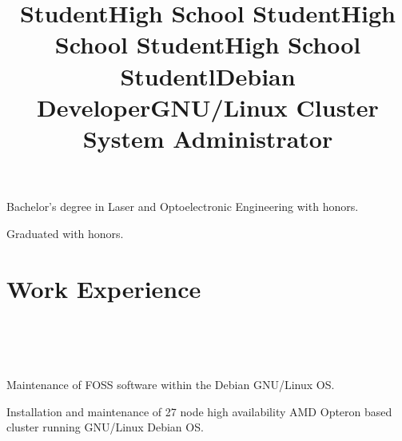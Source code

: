 \documentclass[10pt,overlapped,line]{res}
\begin{document}
\begin{resume}
 \title{Student}
 \begin{position}
  Bachelor's degree in Laser and Optoelectronic Engineering with
  honors.
 \end{position}

 \title{High School Student}
 \begin{position}
  Graduated with honors.
 \end{position}

 \title{High School Student}
 \begin{position}
 \end{position}

 \title{High School Student}
 \begin{position}
 \end{position}

 \section{Work Experience}
 \begin{format}
   \title{l}\\
   \\
   \body\\
 \end{format}

 \title{Debian Developer}
 \location{}
 \begin{position}
   Maintenance of FOSS software within the Debian GNU/Linux OS.
 \end{position}

 \title{GNU/Linux Cluster System Administrator}
 \begin{position}
   Installation and maintenance of 27 node high availability {AMD}
   {O}pteron based cluster running GNU/Linux Debian OS.
 \end{position}


\end{resume}
\end{document}

